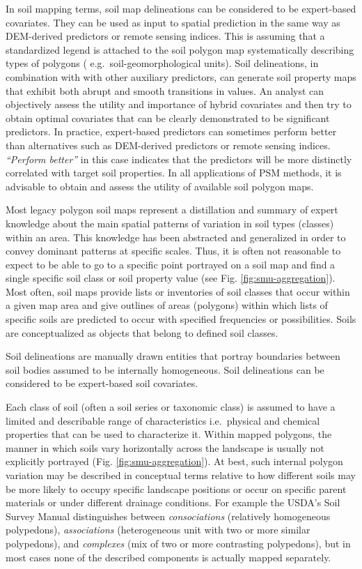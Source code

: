 \documentclass[11pt]{krantz}
\makeatletter
\newenvironment{kframe}{%
\medskip{}
\setlength{\fboxsep}{.8em}
 \def\at@end@of@kframe{}%
 \ifinner\ifhmode%
  \def\at@end@of@kframe{\end{minipage}}%
  \begin{minipage}{\columnwidth}%
 \fi\fi%
 \def\FrameCommand##1{\hskip\@totalleftmargin \hskip-\fboxsep
 \colorbox{shadecolor}{##1}\hskip-\fboxsep
     \hskip-\linewidth \hskip-\@totalleftmargin \hskip\columnwidth}%
 \MakeFramed {\advance\hsize-\width
   \@totalleftmargin\z@ \linewidth\hsize
   \@setminipage}}%
 {\par\unskip\endMakeFramed%
 \at@end@of@kframe}
\newenvironment{rmdblock}[1]
  {
  \begin{itemize}
  \renewcommand{\labelitemi}{
    \raisebox{-.7\height}[0pt][0pt]{
      {\setkeys{Gin}{width=3em,keepaspectratio}\texttt{[image: images/\#1]}}
    }
  }
  \setlength{\fboxsep}{1em}
  \begin{kframe}
  \item
  }
  {
  \end{kframe}
  \end{itemize}
  }
\newenvironment{rmdnote}
  {\begin{rmdblock}{note}}
  {\end{rmdblock}}
\theoremstyle{definition}
\theoremstyle{definition}
\theoremstyle{definition}
\theoremstyle{remark}
\makeatother
\begin{document}
In soil mapping terms, soil map delineations can be considered to be
expert-based covariates. They can be used as input to spatial prediction
in the same way as DEM-derived predictors or remote sensing indices.
This is assuming that a standardized legend is attached to the soil
polygon map systematically describing types of polygons (
e.g.~soil-geomorphological units). Soil delineations, in combination
with with other auxiliary predictors, can generate soil property maps
that exhibit both abrupt and smooth transitions in values. An analyst
can objectively assess the utility and importance of hybrid covariates
and then try to obtain optimal covariates that can be clearly
demonstrated to be significant predictors. In practice, expert-based
predictors can sometimes perform better than alternatives such as
DEM-derived predictors or remote sensing indices. \emph{``Perform
better''} in this case indicates that the predictors will be more
distinctly correlated with target soil properties. In all applications
of PSM methods, it is advisable to obtain and assess the utility of
available soil polygon maps.

Most legacy polygon soil maps represent a distillation and summary of
expert knowledge about the main spatial patterns of variation in soil
types (classes) within an area. This knowledge has been abstracted and
generalized in order to convey dominant patterns at specific scales.
Thus, it is often not reasonable to expect to be able to go to a
specific point portrayed on a soil map and find a single specific soil
class or soil property value (see Fig. \ref{fig:smu-aggregation}). Most
often, soil maps provide lists or inventories of soil classes that occur
within a given map area and give outlines of areas (polygons) within
which lists of specific soils are predicted to occur with specified
frequencies or possibilities. Soils are conceptualized as objects that
belong to defined soil classes.

\begin{rmdnote}
Soil delineations are manually drawn entities that portray boundaries
between soil bodies assumed to be internally homogeneous. Soil
delineations can be considered to be expert-based soil covariates.
\end{rmdnote}

Each class of soil (often a soil series or taxonomic class) is assumed
to have a limited and describable range of characteristics i.e.~physical
and chemical properties that can be used to characterize it. Within
mapped polygons, the manner in which soils vary horizontally across the
landscape is usually not explicitly portrayed (Fig.
\ref{fig:smu-aggregation}). At best, such internal polygon variation may
be described in conceptual terms relative to how different soils may be
more likely to occupy specific landscape positions or occur on specific
parent materials or under different drainage conditions. For example the
USDA's Soil Survey Manual distinguishes between \emph{consociations}
(relatively homogeneous polypedons), \emph{associations} (heterogeneous
unit with two or more similar polypedons), and \emph{complexes} (mix of
two or more contrasting polypedons), but in most cases none of the
described components is actually mapped separately.
\end{document}
